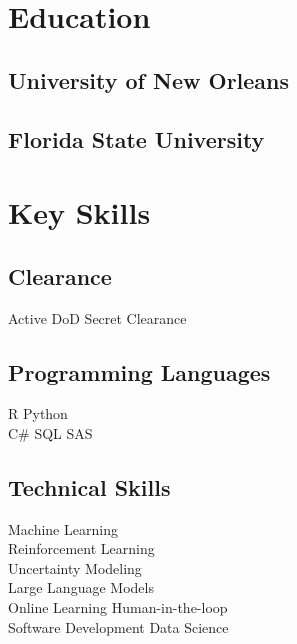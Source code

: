\documentclass[]{deedy-resume-reversed}
\begin{document}
\begin{minipage}[t]{0.33\textwidth}





\section{Education}

\subsection{University of New Orleans}
\sectionsep

\subsection{Florida State University}
\sectionsep


\section{Key Skills}
\subsection{Clearance}
Active DoD Secret Clearance
\sectionsep

\subsection{Programming Languages}
R \textbullet{} Python \\
 C\# \textbullet{} SQL \textbullet{} SAS \\
\sectionsep

\subsection{Technical Skills}
Machine Learning \\
Reinforcement Learning \\
Uncertainty Modeling \\
Large Language Models \\
Online Learning \textbullet{} Human-in-the-loop \\
Software Development \textbullet{} Data Science \\
\sectionsep


\end{minipage}
\end{document}
